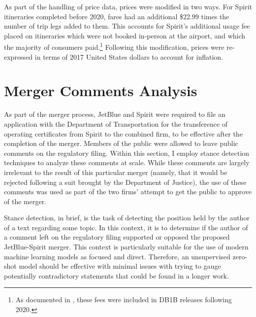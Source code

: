 \documentclass{article}
\begin{document}
\begin{appendices}
	
	As part of the handling of price data, prices were modified in two ways. For Spirit itineraries completed before 2020, fares had an additional \$22.99 times the number of trip legs added to them. This accounts for Spirit's additional usage fee placed on itineraries which were not booked in-person at the airport, and which the majority of consumers paid.\footnote{As documented in \citet{shrago_spirit_2024}, these fees were included in DB1B releases following 2020.} Following this modification, prices were re-expressed in terms of 2017 United States dollars to account for inflation.

    \FloatBarrier
	\section{Merger Comments Analysis}
	\label{sec:NaturalLanguage}

As part of the merger process, JetBlue and Spirit were required to file an application with the Department of Transportation for the transference of operating certificates from Spirit to the combined firm, to be effective after the completion of the merger. Members of the public were allowed to leave public comments on the regulatory filing. Within this section, I employ stance detection techniques to analyze these comments at scale. While these comments are largely irrelevant to the result of this particular merger (namely, that it would be rejected following a suit brought by the Department of Justice), the use of these comments was used as part of the two firms' attempt to get the public to approve of the merger.

Stance detection, in brief, is the task of detecting the position held by the author of a text regarding some topic. In this context, it is to determine if the author of a comment left on the regulatory filing supported or opposed the proposed JetBlue-Spirit merger. This context is particularly suitable for the use of modern machine learning models as focused and direct. Therefore, an unsupervised zero-shot model should be effective with minimal issues with trying to gauge potentially contradictory statements that could be found in a longer work. 


\end{appendices}
\end{document}
